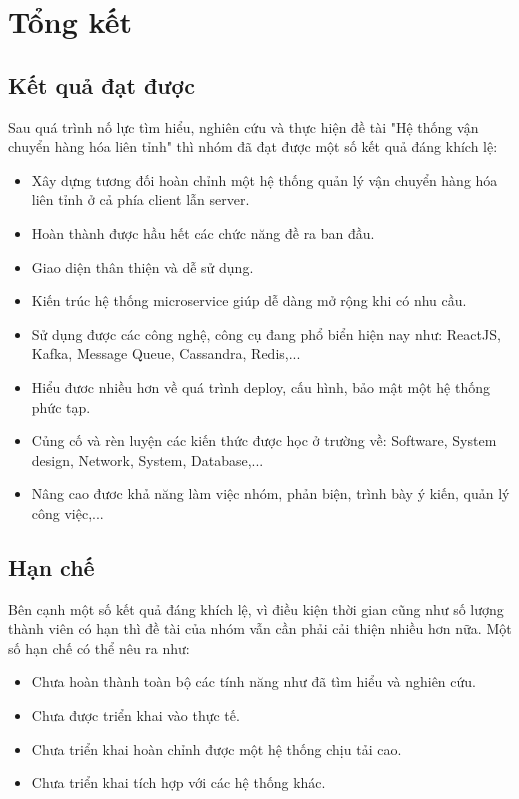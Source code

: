 \chapter{Tổng kết}\label{chap:result}
	\section{Kết quả đạt được}
	Sau quá trình nố lực tìm hiểu, nghiên cứu và thực hiện đề tài "Hệ thống vận chuyển hàng hóa liên tỉnh" thì nhóm đã đạt được một số kết quả đáng khích lệ:
	
	\begin{itemize}
		\item Xây dựng tương đối hoàn chỉnh một hệ thống quản lý vận chuyển hàng hóa liên tỉnh ở cả phía client lẫn server.
		\item Hoàn thành được hầu hết các chức năng đề ra ban đầu.
		\item Giao diện thân thiện và dễ sử dụng.
		\item Kiến trúc hệ thống microservice giúp dễ dàng mở rộng khi có nhu cầu.
		\item Sử dụng được các công nghệ, công cụ đang phổ biển hiện nay như: ReactJS, Kafka, Message Queue, Cassandra, Redis,... 
		\item Hiểu đươc nhiều hơn về quá trình deploy, cấu hình, bảo mật một hệ thống phức tạp.
		\item Củng cố và rèn luyện các kiến thức được học ở trường về: Software, System design, Network, System, Database,...
		\item Nâng cao đươc khả năng làm việc nhóm, phản biện, trình bày ý kiến, quản lý công việc,...
	\end{itemize} 
	
	
	\section{Hạn chế}
	
	Bên cạnh một số kết quả đáng khích lệ, vì điều kiện thời gian cũng như số lượng thành viên có hạn thì đề tài của nhóm vẫn cần phải cải thiện nhiều hơn nữa. Một số hạn chế có thể nêu ra như:


	\begin{itemize}
		\item Chưa hoàn thành toàn bộ các tính năng như đã tìm hiểu và nghiên cứu.
		\item Chưa được triển khai vào thực tế.
		\item Chưa triển khai hoàn chỉnh được một hệ thống chịu tải cao.
		\item Chưa triển khai tích hợp với các hệ thống khác.
	\end{itemize}
	

